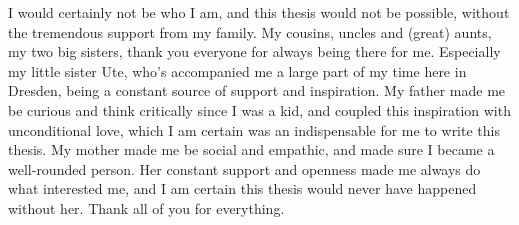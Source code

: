 I would certainly not be who I am, and this thesis would not be possible, without the tremendous support from my family. 
My cousins, uncles and (great) aunts, my two big sisters, thank you everyone for always being there for me. 
Especially my little sister Ute, who's accompanied me a large part of my time here in Dresden, being a constant source of support and inspiration.
My father made me be curious and think critically since I was a kid, and coupled this inspiration with unconditional love, which I am certain was an indispensable for me to write this thesis.
My mother made me be social and empathic, and made sure I became a well-rounded person.
Her constant support and openness made me always do what interested me, and I am certain this thesis would never have happened without her.
Thank all of you for everything.